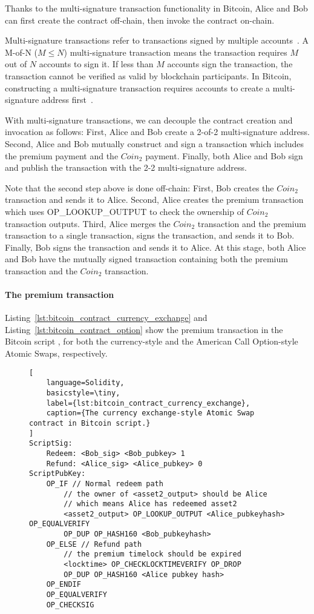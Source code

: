 Thanks to the multi-signature transaction functionality in Bitcoin,
Alice and Bob can first create the contract off-chain, then invoke the contract on-chain.

Multi-signature transactions refer to transactions signed by multiple accounts~\cite{okupski2014bitcoin}.
A M-of-N ($M \leq N$) multi-signature transaction means the transaction requires $M$ out of $N$ accounts to sign it.
If less than $M$ accounts sign the transaction, the transaction cannot be verified as valid by blockchain participants.
In Bitcoin, constructing a multi-signature transaction requires accounts to create a multi-signature address first~\cite{okupski2014bitcoin}.

With multi-signature transactions, we can decouple the contract creation and invocation as follows:
First, Alice and Bob create a 2-of-2 multi-signature address. 
Second, Alice and Bob mutually construct and sign a transaction which includes the premium payment and the $Coin_2$ payment.
Finally, both Alice and Bob sign and publish the transaction with the 2-2 multi-signature address.

Note that the second step above is done off-chain:
First, Bob creates the $Coin_2$ transaction and sends it to Alice.
Second, Alice creates the premium transaction which uses OP\_LOOKUP\_OUTPUT to check the ownership of $Coin_2$ transaction outputs.
Third, Alice merges the $Coin_2$ transaction and the premium transaction to a single transaction, signs the transaction, and sends it to Bob.
Finally, Bob signs the transaction and sends it to Alice.
At this stage, both Alice and Bob have the mutually signed transaction containing both the premium transaction and the $Coin_2$ transaction.

\paragraph{The premium transaction}
Listing~\ref{lst:bitcoin_contract_currency_exchange} and Listing~\ref{lst:bitcoin_contract_option} show the premium transaction in the Bitcoin script
, for both the currency-style and the American Call Option-style Atomic Swaps, respectively.

\begin{figure}[htb]
\begin{lstlisting}[
    language=Solidity, 
    basicstyle=\tiny,
    label={lst:bitcoin_contract_currency_exchange},
    caption={The currency exchange-style Atomic Swap contract in Bitcoin script.}
]
ScriptSig:
    Redeem: <Bob_sig> <Bob_pubkey> 1
    Refund: <Alice_sig> <Alice_pubkey> 0
ScriptPubKey:
    OP_IF // Normal redeem path
        // the owner of <asset2_output> should be Alice
        // which means Alice has redeemed asset2
        <asset2_output> OP_LOOKUP_OUTPUT <Alice_pubkeyhash> OP_EQUALVERIFY 
        OP_DUP OP_HASH160 <Bob_pubkeyhash>
    OP_ELSE // Refund path
        // the premium timelock should be expired
        <locktime> OP_CHECKLOCKTIMEVERIFY OP_DROP
        OP_DUP OP_HASH160 <Alice pubkey hash>
    OP_ENDIF
    OP_EQUALVERIFY
    OP_CHECKSIG
\end{lstlisting}  
\end{figure}

